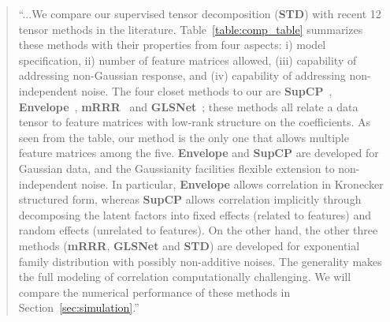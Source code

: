 \documentclass[11pt]{article}
\theoremstyle{plain}
\theoremstyle{definition}
\begin{document}
\begin{enumerate}[wide, labelwidth=!, labelindent=0pt]
\begin{enumerate}[wide, labelwidth=!, labelindent=0pt]
        \begin{quote}
            ``...We compare our supervised tensor decomposition (\textbf{STD}) with recent 12 tensor methods in the literature. Table~\ref{table:comp_table} summarizes these methods with their properties from four aspects: i) model specification, ii) number of feature matrices allowed, (iii) capability of addressing non-Gaussian response, and (iv) capability of addressing non-independent noise. The four closet methods to our are {\bf SupCP}~\citep{lock2018supervised}, {\bf Envelope}~\citep{li2017parsimonious}, {\bf mRRR}~\citep{luo2018leveraging} and {\bf GLSNet}~\citep{zhang2018network}; these methods all relate a data tensor to feature matrices with low-rank structure on the coefficients. As seen from the table, our method is the only one that allows multiple feature matrices among the five. {\bf Envelope} and {\bf SupCP} are developed for Gaussian data, and the Gaussianity facilities flexible extension to non-independent noise. In particular, {\bf Envelope} allows correlation in Kronecker structured form, whereas {\bf SupCP} allows correlation implicitly through decomposing the latent factors into fixed effects (related to features) and random effects (unrelated to features). On the other hand, the other three methods ({\bf mRRR}, {\bf GLSNet} and {\bf STD}) are developed for exponential family distribution with possibly non-additive noises. The generality makes the full modeling of correlation computationally challenging. We will compare the numerical performance of these methods in Section~\ref{sec:simulation}.''


\end{quote}
\end{enumerate}
\end{enumerate}
\end{document}
